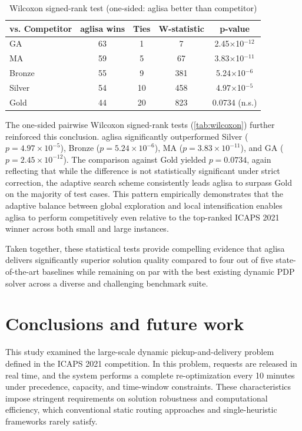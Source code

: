 \documentclass[]{interact}
\begin{document}
\begin{table}[htbp]
\centering
\caption{Wilcoxon signed-rank test (one-sided: \gls{aglisa} better than competitor)}
\label{tab:wilcoxon}
\begin{tabular}{lcccc}
\toprule
vs. Competitor & \gls{aglisa} wins & Ties & W-statistic & p-value \\
\midrule
GA             & 63 & 1  & 7   & 2.45$\times$10$^{-12}$ \\
MA             & 59 & 5  & 67  & 3.83$\times$10$^{-11}$ \\
Bronze         & 55 & 9  & 381 & 5.24$\times$10$^{-6}$ \\
Silver         & 54 & 10 & 458 & 4.97$\times$10$^{-5}$ \\
Gold           & 44 & 20 & 823 & 0.0734 (n.s.) \\
\bottomrule
\end{tabular}%
\end{table}

The one-sided pairwise Wilcoxon signed-rank tests (\autoref{tab:wilcoxon}) further reinforced this conclusion. \gls{aglisa} significantly outperformed Silver ($p = 4.97 \times 10^{-5}$), Bronze ($p = 5.24 \times 10^{-6}$), MA ($p = 3.83 \times 10^{-11}$), and GA ($p = 2.45 \times 10^{-12}$).
The comparison against Gold yielded $p = 0.0734$, again reflecting that while the difference is not statistically significant under strict correction, the adaptive search scheme consistently leads \gls{aglisa} to surpass Gold on the majority of test cases. This pattern empirically demonstrates that the adaptive balance between global exploration and local intensification enables \gls{aglisa} to perform competitively even relative to the top-ranked ICAPS 2021 winner across both small and large instances.

Taken together, these statistical tests provide compelling evidence that \gls{aglisa} delivers significantly superior solution quality compared to four out of five state-of-the-art baselines while remaining on par with the best existing dynamic PDP solver across a diverse and challenging benchmark suite.


\section{Conclusions and future work} \label{sec:con}

This study examined the large-scale dynamic pickup-and-delivery problem defined in the ICAPS 2021 competition. In this problem, requests are released in real time, and the system performs a complete re-optimization every 10 minutes under precedence, capacity, and time-window constraints. These characteristics impose stringent requirements on solution robustness and computational efficiency, which conventional static routing approaches and single-heuristic frameworks rarely satisfy.
\end{document}
